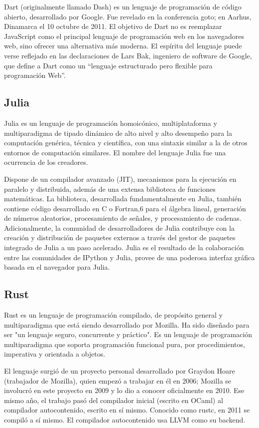 \documentclass[twoside,twocolumn]{article}
\begin{document}
Dart (originalmente llamado Dash) es un lenguaje de programación de código abierto, desarrollado por Google. Fue revelado en la conferencia goto; en Aarhus, Dinamarca el 10 octubre de 2011. El objetivo de Dart no es reemplazar JavaScript como el principal lenguaje de programación web en los navegadores web, sino ofrecer una alternativa más moderna. El espíritu del lenguaje puede verse reflejado en las declaraciones de Lars Bak, ingeniero de software de Google, que define a Dart como un “lenguaje estructurado pero flexible para programación Web”.

\subsection{Julia}

Julia es un lenguaje de programación homoicónico, multiplataforma y multiparadigma de tipado dinámico de alto nivel y alto desempeño para la computación genérica, técnica y científica, con una sintaxis similar a la de otros entornos de computación similares. El nombre del lenguaje Julia fue una ocurrencia de los creadores.

Dispone de un compilador avanzado (JIT), mecanismos para la ejecución en paralelo y distribuida, además de una extensa biblioteca de funciones matemáticas. La biblioteca, desarrollada fundamentalmente en Julia, también contiene código desarrollado en C o Fortran,6 para el álgebra lineal, generación de números aleatorios, procesamiento de señales, y procesamiento de cadenas. Adicionalmente, la comunidad de desarrolladores de Julia contribuye con la creación y distribución de paquetes externos a través del gestor de paquetes integrado de Julia a un paso acelerado. Julia es el resultado de la colaboración entre las comunidades de IPython y Julia, provee de una poderosa interfaz gráfica basada en el navegador para Julia. 

\subsection{Rust}

Rust es un lenguaje de programación compilado, de propósito general y multiparadigma que está siendo desarrollado por Mozilla. Ha sido diseñado para ser "un lenguaje seguro, concurrente y práctico". Es un lenguaje de programación multiparadigma que soporta programación funcional pura, por procedimientos, imperativa y orientada a objetos.

El lenguaje surgió de un proyecto personal desarrollado por Graydon Hoare (trabajador de Mozilla), quien empezó a trabajar en él en 2006; Mozilla se involucró en este proyecto en 2009 y lo dio a conocer oficialmente en 2010. Ese mismo año, el trabajo pasó del compilador inicial (escrito en OCaml) al compilador autocontenido, escrito en sí mismo. Conocido como rustc, en 2011 se compiló a sí mismo. El compilador autocontenido usa LLVM como su backend.
\end{document}
